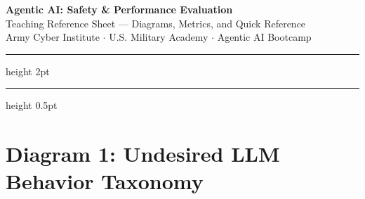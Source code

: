 \documentclass[12pt, letterpaper]{article}
\begin{document}
\begin{center}
    {\LARGE\bfseries\color{accentblue} Agentic AI: Safety \& Performance Evaluation}\\[4pt]
    {\large Teaching Reference Sheet --- Diagrams, Metrics, and Quick Reference}\\[2pt]
    {\small Army Cyber Institute $\cdot$ U.S. Military Academy $\cdot$ Agentic AI Bootcamp}
    \vspace{0.3cm}
    \hrule height 2pt
    \vspace{0.1cm}
    \hrule height 0.5pt
\end{center}

\section{Diagram 1: Undesired LLM Behavior Taxonomy}
\end{document}
